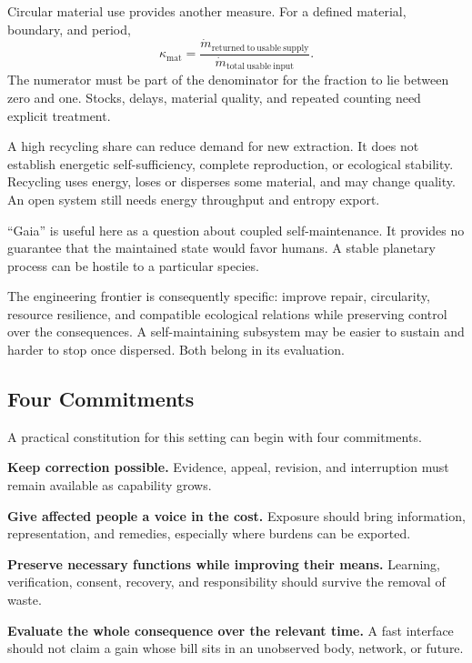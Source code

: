 \documentclass[11pt,openany]{book}
\begin{document}
Circular material use provides another measure. For a defined material, boundary, and period,
\begin{equation}
 \kappa_{\mathrm{mat}}=
 \frac{\dot m_{\mathrm{returned\ to\ usable\ supply}}}
      {\dot m_{\mathrm{total\ usable\ input}}}.
\end{equation}
The numerator must be part of the denominator for the fraction to lie between zero and one. Stocks, delays, material quality, and repeated counting need explicit treatment.

A high recycling share can reduce demand for new extraction. It does not establish energetic self-sufficiency, complete reproduction, or ecological stability. Recycling uses energy, loses or disperses some material, and may change quality. An open system still needs energy throughput and entropy export.

“Gaia” is useful here as a question about coupled self-maintenance. It provides no guarantee that the maintained state would favor humans. A stable planetary process can be hostile to a particular species.

The engineering frontier is consequently specific: improve repair, circularity, resource resilience, and compatible ecological relations while preserving control over the consequences. A self-maintaining subsystem may be easier to sustain and harder to stop once dispersed. Both belong in its evaluation.

\subsection{Four Commitments}

A practical constitution for this setting can begin with four commitments.

\textbf{Keep correction possible.} Evidence, appeal, revision, and interruption must remain available as capability grows.

\textbf{Give affected people a voice in the cost.} Exposure should bring information, representation, and remedies, especially where burdens can be exported.

\textbf{Preserve necessary functions while improving their means.} Learning, verification, consent, recovery, and responsibility should survive the removal of waste.

\textbf{Evaluate the whole consequence over the relevant time.} A fast interface should not claim a gain whose bill sits in an unobserved body, network, or future.
\end{document}
